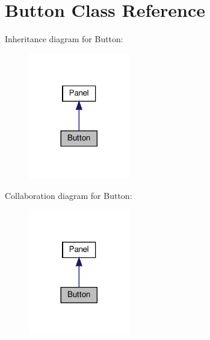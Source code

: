 \hypertarget{classButton}{}\section{Button Class Reference}
\label{classButton}


Inheritance diagram for Button\+:
\nopagebreak
\begin{figure}[H]
\begin{center}
\leavevmode
\includegraphics[width=125pt]{classButton__inherit__graph}
\end{center}
\end{figure}


Collaboration diagram for Button\+:
\nopagebreak
\begin{figure}[H]
\begin{center}
\leavevmode
\includegraphics[width=125pt]{classButton__coll__graph}
\end{center}
\end{figure}
